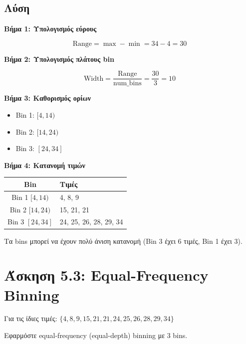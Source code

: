 \subsection*{Λύση}

\textbf{Βήμα 1: Υπολογισμός εύρους}

$$\text{Range} = \max - \min = 34 - 4 = 30$$

\textbf{Βήμα 2: Υπολογισμός πλάτους bin}

$$\text{Width} = \frac{\text{Range}}{\text{num\_bins}} = \frac{30}{3} = 10$$

\textbf{Βήμα 3: Καθορισμός ορίων}

\begin{itemize}
    \item Bin 1: $[4, 14)$
    \item Bin 2: $[14, 24)$
    \item Bin 3: $[24, 34]$
\end{itemize}

\textbf{Βήμα 4: Κατανομή τιμών}

\begin{center}
\begin{tabular}{cl}
\toprule
\textbf{Bin} & \textbf{Τιμές} \\
\midrule
Bin 1 $[4, 14)$ & 4, 8, 9 \\
Bin 2 $[14, 24)$ & 15, 21, 21 \\
Bin 3 $[24, 34]$ & 24, 25, 26, 28, 29, 34 \\
\bottomrule
\end{tabular}
\end{center}

\begin{warningbox}
Τα bins μπορεί να έχουν πολύ άνιση κατανομή (Bin 3 έχει 6 τιμές, Bin 1 έχει 3).
\end{warningbox}

\section{Άσκηση 5.3: Equal-Frequency Binning}

\begin{formulabox}[Εκφώνηση]
Για τις ίδιες τιμές: $\{4, 8, 9, 15, 21, 21, 24, 25, 26, 28, 29, 34\}$

Εφαρμόστε equal-frequency (equal-depth) binning με 3 bins.
\end{formulabox}

